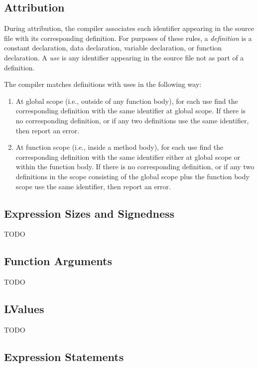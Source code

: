 \documentclass[10pt]{article}
\begin{document}
\subsection{Attribution}

During attribution, the compiler associates each identifier appearing
in the source file with its corresponding definition.  For purposes of
these rules, a \emph{definition} is a constant declaration, data
declaration, variable declaration, or function declaration.  A
\emph{use} is any identifier appearing in the source file not as part
of a definition.

The compiler matches definitions with uses in the following way:
%
\begin{enumerate}
%
\item At global scope (i.e., outside of any function body), for each
  use find the corresponding definition with the same identifier at
  global scope.  If there is no corresponding definition, or if any
  two definitions use the same identifier, then  report an error.
%
\item At function scope (i.e., inside a method body), for each use
  find the corresponding definition with the same identifier either at
  global scope or within the function body.  If there is no
  corresponding definition, or if any two definitions in the scope
  consisting of the global scope plus the function body scope use the
  same identifier, then report an error.
%
\end{enumerate}


\subsection{Expression Sizes and Signedness}

TODO

\subsection{Function Arguments}

TODO

\subsection{LValues}

TODO

\subsection{Expression Statements}
\end{document}
